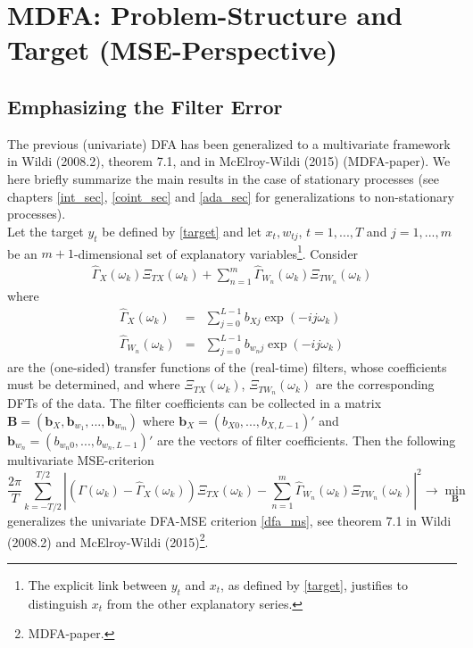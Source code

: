 \documentclass[a4paper]{book}
\begin{document}
\section{MDFA: Problem-Structure and Target (MSE-Perspective)}\label{mdfa_ps_mse}




\subsection{Emphasizing the Filter Error}


The previous (univariate) DFA has been generalized to a multivariate framework in Wildi (2008.2), theorem 7.1, and in McElroy-Wildi (2015) (MDFA-paper).  We here briefly summarize the main results in the case of stationary processes (see chapters \ref{int_sec}, \ref{coint_sec} and \ref{ada_sec} for generalizations to non-stationary processes). \\

Let the target $y_t$ be defined by \ref{target} and let $x_t, w_{tj}$, $t=1,...,T$ and $j=1,...,m$ be an $m+1$-dimensional set of explanatory variables\footnote{The explicit link between $y_t$ and $x_t$, as defined by \ref{target}, justifies to distinguish $x_t$ from the other explanatory series.}. Consider
\begin{eqnarray}
\hat{\Gamma}_X(\omega_k)\Xi_{T
X}(\omega_k)+\sum_{n=1}^m
\hat{\Gamma}_{W_n}(\omega_k)\Xi_{TW_n}(\omega_k)\label{statcase}
\end{eqnarray}
where
\begin{eqnarray}
\hat{\Gamma}_X(\omega_k)&=&\sum_{j=0}^{L-1}b_{Xj} \exp(-ij\omega_k)\label{exp1}\\
\hat{\Gamma}_{W_n}(\omega_k)&=&\sum_{j=0}^{L-1}b_{w_nj} \exp(-ij\omega_k)\label{exp2}
\end{eqnarray}
are the (one-sided) transfer functions of the (real-time) filters, whose coefficients must be determined, and where $\Xi_{TX}(\omega_k)$, $\Xi_{TW_n}(\omega_k)$ are the corresponding DFTs of the data. The filter coefficients can be collected in a matrix $\mathbf{B}=(\mathbf{b}_{X},\mathbf{b}_{w_1},...,\mathbf{b}_{w_m})$ where $\mathbf{b}_{X}=(b_{X0},...,b_{X,L-1})'$ and $\mathbf{b}_{w_n}=(b_{w_n0},...,b_{w_n,L-1})'$ are the vectors of filter coefficients. Then the following multivariate MSE-criterion
\begin{equation}\label{dfanv}
\frac{2\pi}{T} \sum_{k=-T/2}^{T/2}
\left|\left(\Gamma(\omega_k)-\hat{\Gamma}_X(\omega_k)\right)\Xi_{T
X}(\omega_k)-\sum_{n=1}^m
\hat{\Gamma}_{W_n}(\omega_k)\Xi_{TW_n}(\omega_k)\right|^2 \to \min_{\mathbf{B}}
\end{equation}
generalizes the univariate DFA-MSE criterion \ref{dfa_ms}, see theorem 7.1 in Wildi (2008.2) and McElroy-Wildi (2015)\footnote{MDFA-paper.}.\\
\end{document}
